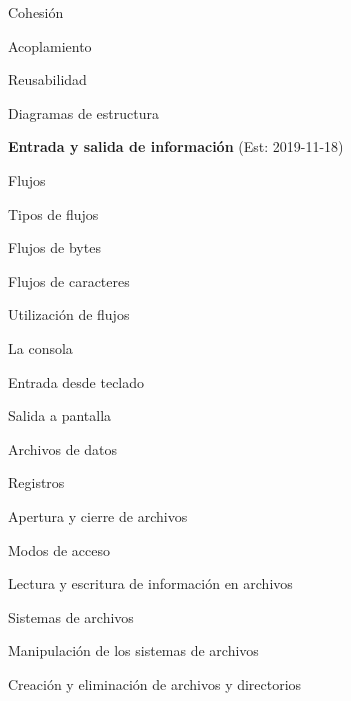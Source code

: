 \begin{longenum}
\begin{longenum}
\begin{longenum}
\begin{longenum}
                \item Cohesión
                \item Acoplamiento
            \end{longenum}
            \item Reusabilidad
        \end{longenum}
        \item Diagramas de estructura
    \end{longenum}
    \item \textbf{Entrada y salida de información}  (Est: 2019-11-18)
    \begin{longenum}
        \item Flujos
        \begin{longenum}
            \item Tipos de flujos
            \begin{longenum}
                \item Flujos de bytes
                \item Flujos de caracteres
            \end{longenum}
            \item Utilización de flujos
        \end{longenum}
        \item La consola
        \begin{longenum}
            \item Entrada desde teclado
            \item Salida a pantalla
        \end{longenum}
        \item Archivos de datos
        \begin{longenum}
            \item Registros
            \item Apertura y cierre de archivos
            \item Modos de acceso
            \item Lectura y escritura de información en archivos
        \end{longenum}
        \item Sistemas de archivos
        \begin{longenum}
            \item Manipulación de los sistemas de archivos
            \item Creación y eliminación de archivos y directorios
        \end{longenum}
    \end{longenum}

\end{longenum}
